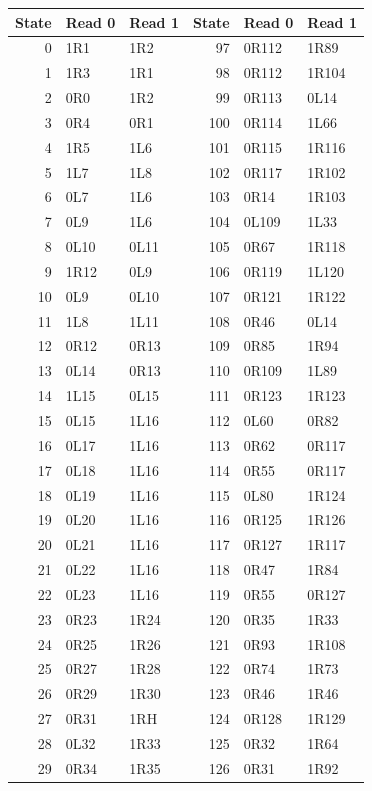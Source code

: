 \begingroup\small
\setlength{\tabcolsep}{10pt}
\begin{longtable}{@{}rllrll@{}}
\toprule State & Read 0 & Read 1 & State & Read 0 & Read 1\\
\midrule\endhead
0 & 1R1 & 1R2 & 97 & 0R112 & 1R89\\
1 & 1R3 & 1R1 & 98 & 0R112 & 1R104\\
2 & 0R0 & 1R2 & 99 & 0R113 & 0L14\\
3 & 0R4 & 0R1 & 100 & 0R114 & 1L66\\
4 & 1R5 & 1L6 & 101 & 0R115 & 1R116\\
5 & 1L7 & 1L8 & 102 & 0R117 & 1R102\\
6 & 0L7 & 1L6 & 103 & 0R14 & 1R103\\
7 & 0L9 & 1L6 & 104 & 0L109 & 1L33\\
8 & 0L10 & 0L11 & 105 & 0R67 & 1R118\\
9 & 1R12 & 0L9 & 106 & 0R119 & 1L120\\
10 & 0L9 & 0L10 & 107 & 0R121 & 1R122\\
11 & 1L8 & 1L11 & 108 & 0R46 & 0L14\\
12 & 0R12 & 0R13 & 109 & 0R85 & 1R94\\
13 & 0L14 & 0R13 & 110 & 0R109 & 1L89\\
14 & 1L15 & 0L15 & 111 & 0R123 & 1R123\\
15 & 0L15 & 1L16 & 112 & 0L60 & 0R82\\
16 & 0L17 & 1L16 & 113 & 0R62 & 0R117\\
17 & 0L18 & 1L16 & 114 & 0R55 & 0R117\\
18 & 0L19 & 1L16 & 115 & 0L80 & 1R124\\
19 & 0L20 & 1L16 & 116 & 0R125 & 1R126\\
20 & 0L21 & 1L16 & 117 & 0R127 & 1R117\\
21 & 0L22 & 1L16 & 118 & 0R47 & 1R84\\
22 & 0L23 & 1L16 & 119 & 0R55 & 0R127\\
23 & 0R23 & 1R24 & 120 & 0R35 & 1R33\\
24 & 0R25 & 1R26 & 121 & 0R93 & 1R108\\
25 & 0R27 & 1R28 & 122 & 0R74 & 1R73\\
26 & 0R29 & 1R30 & 123 & 0R46 & 1R46\\
27 & 0R31 & 1RH & 124 & 0R128 & 1R129\\
28 & 0L32 & 1R33 & 125 & 0R32 & 1R64\\
29 & 0R34 & 1R35 & 126 & 0R31 & 1R92\\

\end{longtable}
